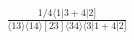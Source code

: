 \documentclass[varwidth, border=5pt]{standalone}
\begin{document}
\begin{my}
$\begin{gathered}
\scriptscriptstyle\frac{1/4⟨1|3+4|2]}{⟨13⟩⟨14⟩[23]⟨34⟩⟨3|1+4|2]}
\end{gathered}$
\end{my}
\end{document}
